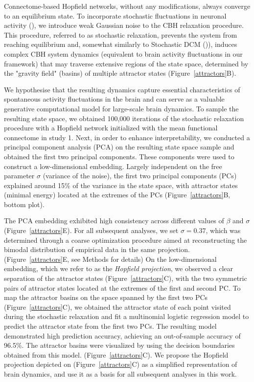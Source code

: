 \documentclass{article}
\begin{document}
Connectome-based Hopfield networks, without any modifications, always converge to an equilibrium state.
To incorporate stochastic fluctuations in neuronal activity (\href{https://doi.org/10.1098/rstb.2005.1638}{}), we introduce weak Gaussian noise to the CBH relaxation procedure. This procedure, referred to as stochastic relaxation, prevents the system from reaching equilibrium and, somewhat similarly to Stochastic DCM (\href{https://doi.org/10.1016/j.neuroimage.2012.04.061}{})), induces complex CBH system dynamics  (equivalent to brain activity fluctuations in our framework) that may traverse extensive regions of the state space, determined by the "gravity field" (basins) of multiple attractor states (Figure~\ref{attractors}B).

We hypothesise that the resulting dynamics capture essential characteristics of spontaneous activity fluctuations in the brain and can serve as a valuable generative computational model for large-scale brain dynamics.
To sample the resulting state space, we obtained 100,000 iterations of the stochastic relaxation procedure with a Hopfield network initialized with the mean functional connectome in study 1.
Next, in order to enhance interpretability, we conducted a principal component analysis (PCA) on the resulting state space sample and obtained the first two principal components. These components were used to construct a low-dimensional embedding.
Largely independent on the free parameter $\sigma$ (variance of the noise), the first two principal components (PCs) explained around 15\% of the variance in the state space, with attractor states (minimal energy) located at the extremes of the PCs (Figure~\ref{attractors}B, bottom plot).

The PCA embedding exhibited high consistency across different values of $\beta$ and $\sigma$ (Figure~\ref{attractors}E).
For all subsequent analyses, we set $\sigma=0.37$, which was determined through a coarse optimization procedure aimed at reconstructing the bimodal distribution of empirical data in the same projection. (Figure~\ref{attractors}E, see Methods for details)
On the low-dimensional embedding, which we refer to as the \textit{Hopfield projection}, we observed a clear separation of the attractor states (Figure~\ref{attractors}C), with the two symmetric pairs of attractor states located at the extremes of the first and second PC.
To map the attractor basins on the space spanned by the first two PCs (Figure~\ref{attractors}C), we obtained the attractor state of each point visited during the stochastic relaxation and fit a multinomial logistic regression model to predict the attractor state from the first two PCs.
The resulting model demonstrated high prediction accuracy, achieving an out-of-sample accuracy of 96.5\%.
The attractor basins were visualized by using the decision boundaries obtained from this model. (Figure~\ref{attractors}C).
We propose the Hopfield projection depicted on (Figure~\ref{attractors}C) as a simplified representation of brain dynamics, and use it as a basis for all subsequent analyses in this work.
\end{document}
